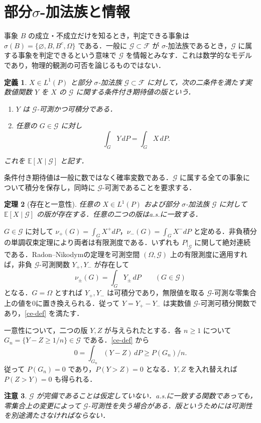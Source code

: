 \documentclass[a5paper,10pt,onecolumn]{jsarticle}
\makeatletter
\theoremstyle{mathnotetheorem}
\newtheorem{theorem}{定理}[section]
\newtheorem{definition}[theorem]{定義}
\newtheorem{remark}[theorem]{注意}
\renewcommand{\proofname}{証明}
\renewenvironment{proof}[1][\proofname]{%
  \par\pushQED{\qed}\normalfont\topsep4\p@\@plus2\p@\relax
  \trivlist\item[\hskip\labelsep\bfseries #1]\ignorespaces
}{\popQED\endtrivlist\@endpefalse}
\newcommand{\F}{\mathcal F}
\newcommand{\G}{\mathcal G}
\newcommand{\E}{\mathbb E}
\newcommand{\1}{\mathbf{1}}
\makeatother
\begin{document}
\section{部分\texorpdfstring{$\sigma$}{σ}-加法族と情報}
事象 $B$ の成立・不成立だけを知るとき，判定できる事象は $\sigma(B)=\{\varnothing,B,B^c,\Omega\}$ である．一般に $\G\subset\F$ が $\sigma$-加法族であるとき，$\G$ に属する事象を判定できるという意味で $\G$ を情報とみなす．これは数学的なモデルであり，物理的観測の可否を論じるものではない．
\begin{definition}
$X\in L^1(P)$ と部分 $\sigma$-加法族 $\G\subset\F$ に対して，次の二条件を満たす実数値関数 $Y$ を $X$ の $\G$ に関する条件付き期待値の版という．
\begin{enumerate}
\item $Y$ は $\G$-可測かつ可積分である．
\item 任意の $G\in\G$ に対し
\begin{equation}\label{ce-def}
 \int_GY\,dP=\int_GX\,dP.
\end{equation}
\end{enumerate}
これを $\E[X\mid\G]$ と記す．
\end{definition}
条件付き期待値は一般に数ではなく確率変数である．$\G$ に属する全ての事象について積分を保存し，同時に $\G$-可測であることを要求する．
\begin{theorem}[存在と一意性]\label{exist}
任意の $X\in L^1(P)$ および部分 $\sigma$-加法族 $\G$ に対して $\E[X\mid\G]$ の版が存在する．任意の二つの版はa.s.に一致する．
\end{theorem}
\begin{proof}
$G\in\G$ に対して $\nu_+(G)=\int_GX^+dP$，$\nu_-(G)=\int_GX^-dP$ と定める．非負積分の単調収束定理により両者は有限測度である．いずれも $P|_\G$ に関して絶対連続である．Radon--Nikodymの定理を可測空間 $(\Omega,\G)$ 上の有限測度に適用すれば，非負 $\G$-可測関数 $Y_+,Y_-$ が存在して
\[
 \nu_\pm(G)=\int_GY_\pm\,dP\qquad(G\in\G)
\]
となる．$G=\Omega$ とすれば $Y_+,Y_-$ は可積分であり，無限値を取る $\G$-可測な零集合上の値を0に置き換えられる．従って $Y=Y_+-Y_-$ は実数値 $\G$-可測可積分関数であり，\eqref{ce-def} を満たす．

一意性について，二つの版 $Y,Z$ が与えられたとする．各 $n\ge1$ について $G_n=\{Y-Z\ge1/n\}\in\G$ である．\eqref{ce-def} から
\[
 0=\int_{G_n}(Y-Z)\,dP\ge P(G_n)/n.
\]
従って $P(G_n)=0$ であり，$P(Y>Z)=0$ となる．$Y,Z$ を入れ替えれば $P(Z>Y)=0$ も得られる．
\end{proof}
\begin{remark}
$\G$ が完備であることは仮定していない．a.s.に一致する関数であっても，零集合上の変更によって $\G$-可測性を失う場合がある．版というためには可測性を別途満たさなければならない．
\end{remark}
\end{document}
